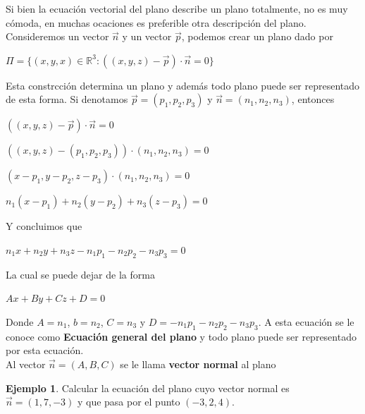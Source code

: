 \documentclass{article}
\theoremstyle{plain}
\theoremstyle{definition}
\newtheorem{ejem}[thm]{Ejemplo}
\begin{document}
Si bien la ecuación vectorial del plano describe un plano totalmente, no es muy cómoda, en muchas ocaciones es preferible otra descripción del plano. \\

Consideremos un vector $\overrightarrow{n}$ y un vector $\overrightarrow{p}$, podemos crear un plano dado por

\begin{center}
$\displaystyle \Pi = \lbrace (x,y,x)\in \mathbb{R}^3 : ((x,y,z)-\overrightarrow{p}) \cdot \overrightarrow{n}=0 \rbrace$
\end{center}


Esta constrcción determina un plano y además todo plano puede ser representado de esta forma. Si denotamos $\overrightarrow{p}=(p_1,p_2,p_3)$ y $\overrightarrow{n}=(n_1,n_2,n_3)$, entonces

\begin{center}
$((x,y,z)-\overrightarrow{p}) \cdot \overrightarrow{n}=0$
\end{center}

\begin{center}
$((x,y,z)-(p_1,p_2,p_3)) \cdot (n_1,n_2,n_3)=0$
\end{center}

\begin{center}
$(x-p_1,y-p_2,z-p_3) \cdot (n_1,n_2,n_3)=0$
\end{center}


\begin{center}
$n_1(x-p_1)+n_2(y-p_2)+n_3(z-p_3)=0$
\end{center}


Y concluimos que

\begin{center}
$n_1x+n_2y+n_3z-n_1p_1-n_2p_2-n_3p_3=0$
\end{center}

La cual se puede dejar de la forma

\begin{center}
$Ax+By+Cz+D=0$
\end{center}

Donde $A=n_1$, $b=n_2$, $C=n_3$ y $D=-n_1p_1-n_2p_2-n_3p_3 $. A esta ecuación se le conoce como \textbf{Ecuación general del plano} y todo plano puede ser representado por esta ecuación. \\

Al vector  $\overrightarrow{n}=(A,B,C)$ se le llama \textbf{vector normal} al plano



\begin{ejem}Calcular la ecuación del plano cuyo vector normal es $\overrightarrow{n}=(1,7,-3)$ y que pasa por el punto $(-3,2,4)$.\\
\end{ejem}
\end{document}
